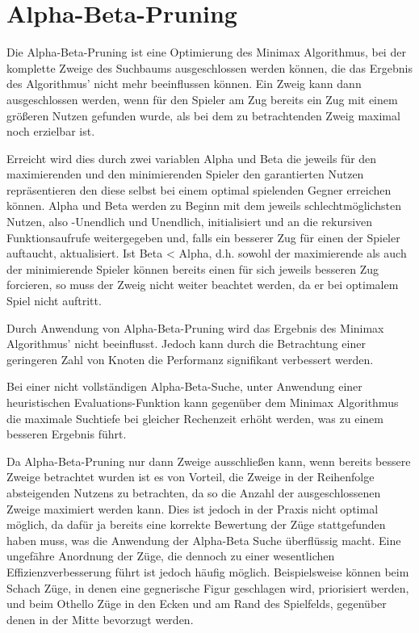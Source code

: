 \section{Alpha-Beta-Pruning}

Die Alpha-Beta-Pruning ist eine Optimierung des Minimax Algorithmus, bei der komplette Zweige des Suchbaums ausgeschlossen werden können, die das Ergebnis des Algorithmus' nicht mehr beeinflussen können.
Ein Zweig kann dann ausgeschlossen werden, wenn für den Spieler am Zug bereits ein Zug mit einem größeren Nutzen gefunden wurde, als bei dem zu betrachtenden Zweig maximal noch erzielbar ist.

Erreicht wird dies durch zwei variablen Alpha und Beta die jeweils für den maximierenden und den minimierenden Spieler den garantierten Nutzen repräsentieren den diese selbst bei einem optimal spielenden Gegner
erreichen können. Alpha und Beta werden zu Beginn mit dem jeweils schlechtmöglichsten Nutzen, also -Unendlich und Unendlich, initialisiert und an die rekursiven Funktionsaufrufe weitergegeben und, falls ein besserer Zug
für einen der Spieler auftaucht, aktualisiert.
Ist Beta < Alpha, d.h. sowohl der maximierende als auch der minimierende Spieler können bereits einen für sich jeweils besseren Zug forcieren, so muss der Zweig nicht weiter beachtet werden, da er bei optimalem Spiel nicht auftritt.

Durch Anwendung von Alpha-Beta-Pruning wird das Ergebnis des Minimax Algorithmus' nicht beeinflusst. Jedoch kann durch die Betrachtung einer geringeren Zahl von Knoten die Performanz signifikant verbessert werden.

Bei einer nicht vollständigen Alpha-Beta-Suche, unter Anwendung einer heuristischen Evaluations-Funktion kann gegenüber dem Minimax Algorithmus die maximale Suchtiefe bei gleicher Rechenzeit erhöht werden, was zu einem besseren Ergebnis führt.

Da Alpha-Beta-Pruning nur dann Zweige ausschließen kann, wenn bereits bessere Zweige betrachtet wurden ist es von Vorteil, die Zweige in der Reihenfolge absteigenden Nutzens zu betrachten, da so die Anzahl der ausgeschlossenen
Zweige maximiert werden kann.
Dies ist jedoch in der Praxis nicht optimal möglich, da dafür ja bereits eine korrekte Bewertung der Züge stattgefunden haben muss, was die Anwendung der Alpha-Beta Suche überflüssig macht.
Eine ungefähre Anordnung der Züge, die dennoch zu einer wesentlichen Effizienzverbesserung führt ist jedoch häufig möglich.
Beispielsweise können beim Schach Züge, in denen eine gegnerische Figur geschlagen wird, priorisiert werden, und beim Othello Züge in den Ecken und am Rand des Spielfelds, gegenüber denen in der Mitte bevorzugt werden.
